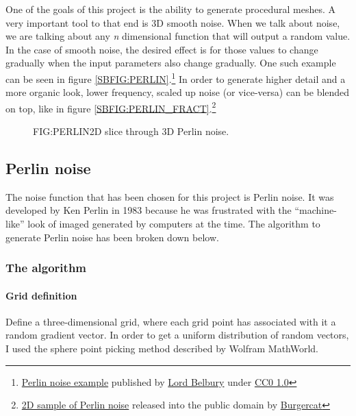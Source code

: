 One of the goals of this project is the ability to generate procedural meshes.
A very important tool to that end is 3D smooth noise.
When we talk about noise,
we are talking about any \textit{n} dimensional function that will output a random value.
In the case of smooth noise,
the desired effect is for those values to change gradually when the input parameters also change gradually.
One such example can be seen in figure \ref{SBFIG:PERLIN}.\footnote{
\href{https://upload.wikimedia.org/wikipedia/commons/8/88/Perlin_noise_example.png}{Perlin noise example}
published by
\href{https://commons.wikimedia.org/wiki/User:Lord_Belbury}{Lord Belbury}
under
\href{https://creativecommons.org/publicdomain/zero/1.0/deed.en}{CC0 1.0}}
In order to generate higher detail and a more organic look,
lower frequency, scaled up noise (or vice-versa) can be blended on top,
like in figure \ref{SBFIG:PERLIN_FRACT}.\footnote{
\href{https://upload.wikimedia.org/wikipedia/commons/f/f7/2D_sample_of_Perlin_noise.png}{2D sample of Perlin noise}
released into the public domain by
\href{https://en.wikipedia.org/wiki/User:Burgercat}{Burgercat}}

\begin{figure}[Perlin noise example]{FIG:PERLIN}{2D slice through 3D Perlin noise.}
\end{figure}

\subsection{Perlin noise}


The noise function that has been chosen for this project is Perlin noise.
It was developed by Ken Perlin in 1983 because he was frustrated with the ``machine-like'' look of imaged generated by computers at the time.\cite{making_noise}
The algorithm to generate Perlin noise has been broken down below.

\subsubsection{The algorithm}

\paragraph{Grid definition}
Define a three-dimensional grid,
where each grid point has associated with it a random gradient vector.
In order to get a uniform distribution of random vectors,
I used the sphere point picking method described by Wolfram MathWorld\cite{sphere_point}.

